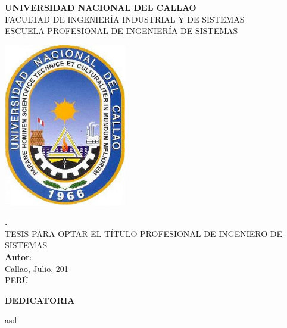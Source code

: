 \documentclass[12pt,a4paper,oneside]{report}
\begin{document}
\begin{titlepage}
 
\begin{center}
 
 {\huge \bf UNIVERSIDAD NACIONAL DEL CALLAO}\\
 
{\Large FACULTAD DE INGENIERÍA INDUSTRIAL Y DE SISTEMAS}\\{\Large ESCUELA PROFESIONAL DE INGENIERÍA DE SISTEMAS}\\[2.0cm]


\begin{center}
\includegraphics[width=0.4\textwidth]{imagenes/logo_unac}
\end{center}

\vspace{1cm}
\title{} %
{\bf \large . }\\[1cm] %

{TESIS PARA OPTAR EL TÍTULO PROFESIONAL DE INGENIERO DE SISTEMAS}\\[1.5cm]
 
{{\bf Autor}: }\\[2.0cm] %

{\large Callao, Julio, 201-}\\[0.2cm] %
{PERÚ}
\end{center}

\end{titlepage}

\newpage
\newpage

\begin{titlepage}

\begin{flushright}
{\large \bf DEDICATORIA}

\cite{arceda2017deteccion}asd
\cite{En2017}
\\
\textit{}
\\
\textit{} %
\end{flushright}
\end{titlepage}
\end{document}
